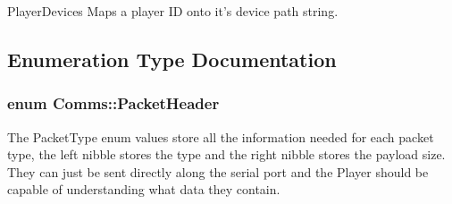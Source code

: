 Player\-Devices Maps a player I\-D onto it's device path string. 



\subsection{Enumeration Type Documentation}
\hypertarget{namespaceComms_a2c437ccb25ec06a8a5b10960c31b7246}{
\subsubsection[{Packet\-Header}]{\setlength{\rightskip}{0pt plus 5cm}enum {\bf Comms\-::\-Packet\-Header}}}\label{namespaceComms_a2c437ccb25ec06a8a5b10960c31b7246}


The Packet\-Type enum values store all the information needed for each packet type, the left nibble stores the type and the right nibble stores the payload size. They can just be sent directly along the serial port and the Player should be capable of understanding what data they contain. 

